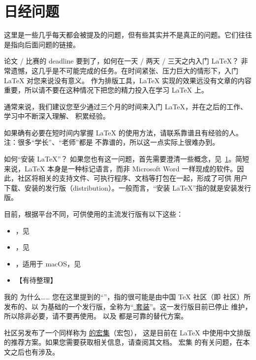 \section{日经问题}

这里是一些几乎每天都会被提及的问题，但有些其实并不是真正的问题。它们往往是指向后面问题的链接。

\begin{faq}{论文 / 比赛的 deadline 要到了，如何在一天 / 两天 / 三天之内入门 \LaTeX{}？}
非常遗憾，这几乎是不可能完成的任务。在时间紧张、压力巨大的情形下，入门 \LaTeX{} 对您来说没有意义。
作为排版工具，\LaTeX{} 实现的效果远没有文章的内容重要，所以请不要在这种情况下把您的精力投入在学习
\LaTeX{} 上。

通常来说，我们建议您至少通过三个月的时间来入门 \LaTeX{}，并在之后的工作、学习中不断深入理解、
积累经验。

如果确有必要在短时间内掌握 \LaTeX{} 的使用方法，请联系靠谱且有经验的人。注：很多“学长”、“老师”都是
不靠谱的，所以这一点实际上很难办到。
\end{faq}

\begin{faq}{如何“安装 \LaTeX{}”？}
如果您也有这一问题，首先需要澄清一些概念，见~\ref{}。简短来说，\LaTeX{} 本身是一种标记语言，而非
Microsoft Word 一样现成的软件。因此，社区将相关的支持文件、可执行程序、文档等打包在一起，形成了可供
用户下载、安装的发行版（distribution）。一般而言，“安装 \LaTeX{}”指的就是安装发行版。

目前，根据平台不同，可供使用的主流发行版有以下这些：

\begin{itemize}
  \item \TeXLive{}，见%
  \item \MiKTeX{}，见%
  \item \MacTeX{}，适用于 macOS，见%
  \item 【有待整理】
\end{itemize}
\end{faq}

\begin{faq}{我的 \CTeX{} 为什么……}
您在这里提到的“\CTeX{}”，指的很可能是由中国 \TeX{} 社区（即 \CTeX{} 社区）所发布的、以 \MiKTeX{}
为基础的一个发行版，全称为“\href{http://www.ctex.org/CTeX}{\CTeX{} 套装}”。这一发行版目前已停止
维护，所以除非必要，请不要再使用。\TeXLive{} 以及 \MiKTeX{} 都是可靠的替代方案。

\CTeX{} 社区另发布了一个同样称为 \href{https://www.ctan.org/pkg/ctex}{\CTeX{} 的宏集}（宏包），
这是目前在 \LaTeX{} 中使用中文排版的推荐方案。如果您需要获取相关信息，请查阅其文档。\CTeX{} 宏集
的有关问题，在本文之后也有涉及。
\end{faq}
